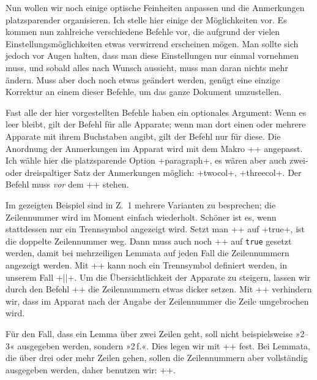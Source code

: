 Nun wollen wir noch einige optische Feinheiten anpassen und die Anmerkungen platzsparender organisieren. 
Ich stelle hier einige der Möglichkeiten vor. Es kommen nun zahlreiche verschiedene Befehle vor, 
die aufgrund der vielen Einstellungsmöglichkeiten etwas verwirrend erscheinen mögen. Man sollte 
sich jedoch vor Augen halten, dass man diese Einstellungen nur einmal vornehmen muss, 
und sobald alles nach Wunsch aussieht, 
muss man daran nichts mehr ändern. 
Muss aber doch noch etwas geändert werden, genügt eine
          einzige Korrektur an einem dieser Befehle, um das ganze
          Dokument umzustellen.

Fast alle der hier vorgestellten Befehle haben ein optionales Argument: Wenn es leer bleibt, gilt der Befehl für alle Apparate; wenn man dort einen oder 
mehrere Apparate mit ihrem Buchstaben angibt, gilt der Befehl nur für diese.
%
Die Anordnung der Anmerkungen im Apparat wird mit dem Makro ++ angepasst. 
Ich wähle hier die platzsparende Option +paragraph+, es wären aber auch zwei- oder dreispaltiger Satz der Anmerkungen möglich: +twocol+, +threecol+. Der Befehl muss \emph{vor} dem +\beginnumbering+ stehen. 

\begin{sloppypar}
Im gezeigten Beispiel sind in Z.~1 mehrere Varianten zu besprechen; die Zeilennummer wird 
im Moment einfach wiederholt. Schöner ist es, wenn stattdessen nur ein Trennsymbol 
angezeigt wird. Setzt man +\Xnumberonlyfirstinline[<app>][<bool>]+ auf +true+, ist die doppelte 
Zeilennummer weg. Dann muss auch noch +\Xnumberonlyfirstintwolines[<app>][<bool>]+ auf \texttt{true} 
gesetzt werden, damit bei mehrzeiligen Lemmata auf jeden Fall die Zeilennummern 
angezeigt werden. Mit ++ kann noch ein Trennsymbol 
definiert werden, in unserem Fall +||+.
%
Um die Übersichtlichkeit der Apparate zu steigern, lassen wir durch den Befehl 
++ die Zeilennummern etwas dicker setzen.
%
Mit +\Xnonbreakableafternumber[<app>]+ verhindern wir, dass im Apparat nach der Angabe der Zeilennummer die Zeile umgebrochen wird.
\end{sloppypar}

Für den Fall, dass ein Lemma über zwei Zeilen geht, soll nicht beispielsweise »2--3« 
ausgegeben werden, sondern »2\,f.«. Dies legen wir mit ++ 
fest. Bei Lemmata, die über drei oder mehr Zeilen gehen, sollen die Zeilennummern 
aber vollständig ausgegeben werden, daher benutzen wir: +\Xtwolinesbutnotmore[<app>]+.

